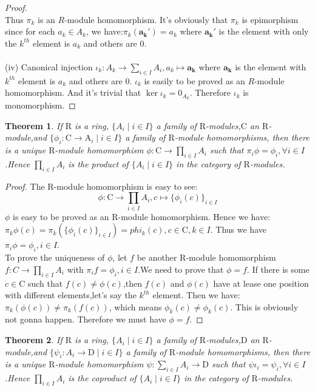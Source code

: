 \documentclass[a4paper]{article}
\newtheorem{myTheo}{Theorem}
\begin{document}
\begin{proof}
$$        $$
        Thus $\pi_k$ is an $R$-module homomorphism. It's obviously that $\pi_k$ is epimorphism since for each $a_k\in A_k$, we have:$\pi_k(\mathbf{a_k'})=a_k$ where $\mathbf{a_k'}$ is the element with only the $k^{th}$ element is $a_k$ and others are 0.\\
        \vspace{0.2cm}\\
        (iv) Canonical injection $\iota_k:A_k\rightarrow \sum_{i\in I}A_i,a_k\mapsto \mathbf{a_k}$ where $\mathbf{a_k}$ is the element with $k^{th}$ element is $a_k$ and others are 0. $\iota_k$ is easily to be proved as an $R$-module 
        homomorphism. And it's trivial that $\ker \iota_k={0_{A_k}}$. Therefore $\iota_k$ is monomorphism.
    \end{proof}
    \vspace{0.5cm}
    \begin{myTheo}
        If $\mathrm{R}$ is a ring, $\{A_i\;|\;i\in I\}$ a family of $\mathrm{R}$-modules,$\mathrm{C}$ an $\mathrm{R}$-module,and $\{\phi_i:\mathrm{C}\rightarrow \mathrm{A}_i\;|\;i\in I\}$ a family of $\mathrm{R}$-module homomorphisms, then there is a unique
        $\mathrm{R}$-module homomorphism $\phi:\mathrm{C}\rightarrow \prod_{i\in I}A_i$ such that $\pi_i\phi=\phi_i,\forall i\in I$.Hence $\prod_{i\in I}A_i$ is the product of $\{A_i\;|\;i\in I\}$ in the category of $\mathrm{R}$-modules.
    \end{myTheo}
    \begin{proof}
        The $\mathrm{R}$-module homomorphism is easy to see:
        $$
        \phi:\mathrm{C}\rightarrow \prod_{i\in I}A_i,c\mapsto \{\phi_i(c)\}_{i\in I}
        $$
        $\phi$ is easy to be proved as an $\mathrm{R}$-module homomorphism. Hence we have:$\pi_k\phi(c)=\pi_k(\{\phi_i(c)\}_{i\in I})=phi_k(c),c\in \mathrm{C},k\in I$. Thus we have $\pi_i\phi=\phi_i,i\in I$.\\
        To prove the uniqueness of $\phi$, let $f$ be another $\mathrm{R}$-module homomorphism $f:C\rightarrow \prod_{i\in I}A_i$ with $\pi_if=\phi_i,i\in I$.We need to prove that $\phi=f$. If there is some $c\in\mathrm{C}$ such that $f(c)\neq\phi(c)$,then $f(c)$ and $\phi(c)$ 
        have at lease one position with different elements,let's say the $k^{th}$ element. Then we have:$\pi_k(\phi(c))\neq\pi_k(f(c))$, which means $\phi_k(c)\neq \phi_k(c)$. This is obviously not gonna happen. Therefore we must have $\phi=f$.
    \end{proof}
    \vspace{0.5cm}
    \begin{myTheo}
        If $\mathrm{R}$ is a ring, $\{A_i\;|\;i\in I\}$ a family of $\mathrm{R}$-modules,$\mathrm{D}$ an $\mathrm{R}$-module,and $\{\psi_i:A_i\rightarrow \mathrm{D}\;|\;i\in I\}$ a family of $\mathrm{R}$-module homomorphisms, then there is a unique
        $\mathrm{R}$-module homomorphism $\psi:\sum_{i\in I}A_i\rightarrow \mathrm{D}$ such that $\psi\iota_i=\psi_i,\forall i\in I$.Hence $\prod_{i\in I}A_i$ is the coproduct of $\{A_i\;|\;i\in I\}$ in the category of $\mathrm{R}$-modules.
    \end{myTheo}
\end{document}
